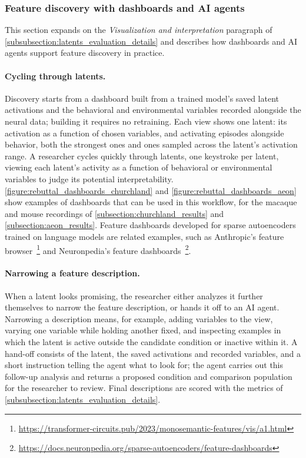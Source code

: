 \subsubsection{Feature discovery with dashboards and AI agents}
\label{subsubsection:rebuttal_dashboards_feature_discovery}

This section expands on the \textit{Visualization and interpretation} paragraph of \hyperref[subsubsection:latents_evaluation_details]{\ref*{subsubsection:latents_evaluation_details}} and describes how dashboards and AI agents support feature discovery in practice.

\paragraph{Cycling through latents.}
Discovery starts from a dashboard built from a trained model's saved latent activations and the behavioral and environmental variables recorded alongside the neural data; building it requires no retraining. Each view shows one latent: its activation as a function of chosen variables, and activating episodes alongside behavior, both the strongest ones and ones sampled across the latent's activation range. A researcher cycles quickly through latents, one keystroke per latent, viewing each latent's activity as a function of behavioral or environmental variables to judge its potential interpretability. \autoref{figure:rebuttal_dashboards_churchland} and \autoref{figure:rebuttal_dashboards_aeon} show examples of dashboards that can be used in this workflow, for the macaque and mouse recordings of \hyperref[subsection:churchland_results]{\ref*{subsection:churchland_results}} and \hyperref[subsection:aeon_results]{\ref*{subsection:aeon_results}}. Feature dashboards developed for sparse autoencoders trained on language models are related examples, such as Anthropic's feature browser~\citep{bricken_2023_towards_monosemanticity}\footnote{\url{https://transformer-circuits.pub/2023/monosemantic-features/vis/a1.html}} and Neuronpedia's feature dashboards~\citep{lin_2023_neuronpedia}\footnote{\url{https://docs.neuronpedia.org/sparse-autoencoders/feature-dashboards}}.

\paragraph{Narrowing a feature description.}
When a latent looks promising, the researcher either analyzes it further themselves to narrow the feature description, or hands it off to an AI agent. Narrowing a description means, for example, adding variables to the view, varying one variable while holding another fixed, and inspecting examples in which the latent is active outside the candidate condition or inactive within it. A hand-off consists of the latent, the saved activations and recorded variables, and a short instruction telling the agent what to look for; the agent carries out this follow-up analysis and returns a proposed condition and comparison population for the researcher to review. Final descriptions are scored with the metrics of \hyperref[subsubsection:latents_evaluation_details]{\ref*{subsubsection:latents_evaluation_details}}.

